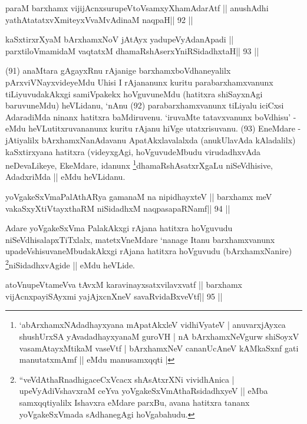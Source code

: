 \begin{shl}
paraM barxhamx vijijAcnxsurupeVtoV\s samxyXhamAdarAtf ||
anushAdhi yathAtatatxvXmiteyxVvaMvAdinaM naqpaH\hfill || 92 ||
\end{shl}

\begin{shl}
kaSxtirxrXyaM bArxhamxNoV jAtAyx yadupeVyAdanApadi ||
parxtiloVmamidaM vaqtatxM dhamaRshAserxYniRSidadhxtaH\hfill || 93 ||
\end{shl}

\begin{artha}
(91) anaMtara gAgayxRnu rAjanige barxhamxboVdhaneyalilx pArxviVNayxvideyeMdu Uhisi I rAjananunx kuritu parabarxhamxvanunx tiLiyuvudakAkxgi samiVpakekx hoVguvuneMdu (hatitxra shiSayxnAgi baruvuneMdu) heVLidanu, `nAnu (92) parabarxhamxvanunx tiLiyalu iciCxsi AdaradiMda ninanx hatitxra baMdiruvenu. `iruvaMte tatavxvanunx boVdhisu' - eMdu heVLutitxruvananunx kuritu rAjanu hiVge utatxrisuvanu. (93) EneMdare - jAtiyalilx bArxhamxNanAdavanu ApatAkxlavalalxda (anukUlavAda kAladalilx) kaSxtirxyana hatitxra (videyxgAgi, hoVguvudeMbudu virudadhxvAda neDevaLikeye, EkeMdare, idanunx \footnote[10]{`abArxhamxNAdadhayxyana mApatAkxleV vidhiVyateV | anuvarxjAyxca shushUrxSA yAvadadhayxyanaM guroVH | nA bArxhamxNeVgurw shiSoyxV vasamAtayxMtikaM vaseVtf | bArxhamxNeV cananUcAneV kAMkaSxnf gati manutatxmAmf || eMdu manusamxqqti |}dhamaRshAsatxrXgaLu niSeVdhisive, AdadxriMda || eMdu heVLidanu.
\end{artha} 

\begin{shl}
yoVgakeSxVmaPalAthARya gamanaM na nipidhayxteV ||
barxhamx meV vakaSxyXtiVtayxthaRM niSidadhxM naqpasapaRNamf\hfill || 94 ||
\end{shl}

\begin{artha}
Adare yoVgakeSxVma PalakAkxgi rAjana hatitxra hoVguvudu niSeVdhisalapxTiTxlalx, matetxVneMdare `nanage Itanu barxhamxvanunx upadeVshisuvaneMbudakAkxgi rAjana hatitxra hoVguvudu (bArxhamxNanire) \footnote[11]{``veVdAthaRnadhigaceCxVcacx shAsAtxrXNi vividhAnica | upeVyAdiVshavxraM ceYva yoVgakeSxVmAthaRsidadhxyeV || eMba samxqqtiyalilx Ishavxra eMdare parxBu, avana hatitxra tananx yoVgakeSxVmada sAdhanegAgi hoVgabahudu.}niSidadhxvAgide || eMdu heVLide.
\end{artha}

\begin{shl}
atoV\s nupeVtameVva tAvxM karavinayxsatxvilavxvatf ||
barxhamx vijAcnxpayiSAyxmi yajAjxcnXneV savaRvidaBxveVtf\hfill || 95 ||
\end{shl}


